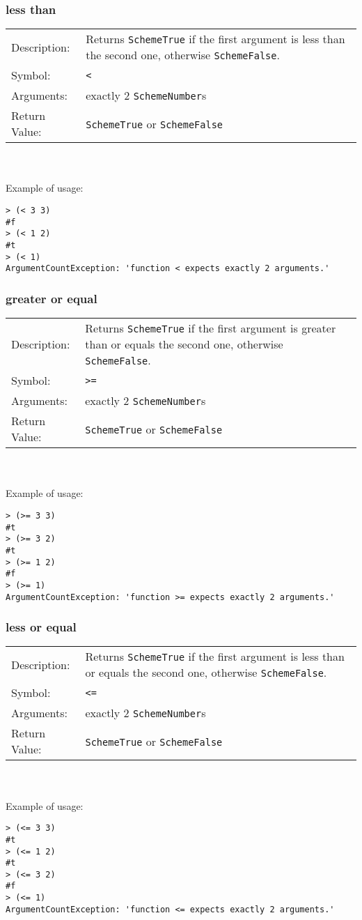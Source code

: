\documentclass[12pt,a4paper]{scrartcl}
\begin{document}
\subsubsection*{less than}
\begin{tabular}{l  p{13cm}}
Description: & Returns \lstinline{SchemeTrue} if the first argument is less than the second one, otherwise \lstinline{SchemeFalse}. \\
Symbol: & \lstinline{<}\\
Arguments: & exactly 2 \lstinline{SchemeNumber}s\\
Return Value: & \lstinline{SchemeTrue} or \lstinline{SchemeFalse}
\end{tabular}
\\
\\
Example of usage:
\begin{lstlisting}
> (< 3 3)
#f
> (< 1 2)
#t
> (< 1)
ArgumentCountException: 'function < expects exactly 2 arguments.'
\end{lstlisting}

\subsubsection*{greater or equal}
\begin{tabular}{l  p{13cm}}
Description: & Returns \lstinline{SchemeTrue} if the first argument is greater than or equals the second one, otherwise \lstinline{SchemeFalse}. \\
Symbol: & \lstinline{>=}\\
Arguments: & exactly 2 \lstinline{SchemeNumber}s\\
Return Value: & \lstinline{SchemeTrue} or \lstinline{SchemeFalse}
\end{tabular}
\\
\\
Example of usage:
\begin{lstlisting}
> (>= 3 3)
#t
> (>= 3 2)
#t
> (>= 1 2)
#f
> (>= 1)
ArgumentCountException: 'function >= expects exactly 2 arguments.'
\end{lstlisting}

\subsubsection*{less or equal}
\begin{tabular}{l  p{13cm}}
Description: & Returns \lstinline{SchemeTrue} if the first argument is less than or equals the second one, otherwise \lstinline{SchemeFalse}. \\
Symbol: & \lstinline{<=}\\
Arguments: & exactly 2 \lstinline{SchemeNumber}s\\
Return Value: & \lstinline{SchemeTrue} or \lstinline{SchemeFalse}
\end{tabular}
\\
\\
Example of usage:
\begin{lstlisting}
> (<= 3 3)
#t
> (<= 1 2)
#t
> (<= 3 2)
#f
> (<= 1)
ArgumentCountException: 'function <= expects exactly 2 arguments.'
\end{lstlisting}
\end{document}

